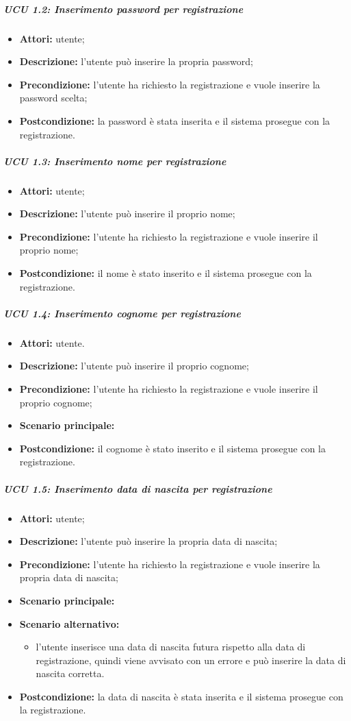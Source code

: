 \subparagraph{UCU 1.2: Inserimento password per registrazione}
\begin{itemize}
	\item \textbf{Attori:} utente;
	\item \textbf{Descrizione:} l'utente può inserire la propria password;
	\item \textbf{Precondizione:} l'utente ha richiesto la registrazione e vuole inserire la password scelta;
	\item \textbf{Postcondizione:} la password è stata inserita e il sistema prosegue con la registrazione.
\end{itemize}

\subparagraph{UCU 1.3: Inserimento nome per registrazione}
\begin{itemize}
	\item \textbf{Attori:} utente;
	\item \textbf{Descrizione:} l'utente può inserire il proprio nome;
	\item \textbf{Precondizione:} l'utente ha richiesto la registrazione e vuole inserire il proprio nome;
	\item \textbf{Postcondizione:} il nome è stato inserito e il sistema prosegue con la registrazione.
\end{itemize}

\subparagraph{UCU 1.4: Inserimento cognome per registrazione}
\begin{itemize}
	\item \textbf{Attori:} utente.
	\item \textbf{Descrizione:} l'utente può inserire il proprio cognome;
	\item \textbf{Precondizione:} l'utente ha richiesto la registrazione e vuole inserire il proprio cognome;
	\item \textbf{Scenario principale:}
	\item \textbf{Postcondizione:} il cognome è stato inserito e il sistema prosegue con la registrazione.
\end{itemize}

\subparagraph{UCU 1.5: Inserimento data di nascita per registrazione}
\begin{itemize}
	\item \textbf{Attori:} utente;
	\item \textbf{Descrizione:} l'utente può inserire la propria data di nascita;
	\item \textbf{Precondizione:} l'utente ha richiesto la registrazione e vuole inserire la propria data di nascita;
	\item \textbf{Scenario principale:}
	\item \textbf{Scenario alternativo:}
	\begin{itemize}
    \item l'utente inserisce una data di nascita futura rispetto alla data di registrazione, quindi viene avvisato con un errore e può inserire la data di nascita corretta.
    \end{itemize}
	\item \textbf{Postcondizione:} la data di nascita è stata inserita e il sistema prosegue con la registrazione.
\end{itemize}

